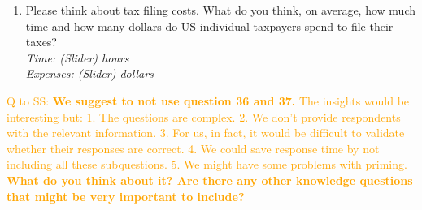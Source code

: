\documentclass[11pt]{article}
\newcommand{\tk}[1]{\textcolor{orange}{#1}}
\begin{document}
\begin{enumerate}[resume]
    \item Please think about tax filing costs. What do you think, on average, how much time and how many dollars do US individual taxpayers spend to file their taxes? \\
    \textit{Time: (Slider) hours} \\
    \textit{Expenses: (Slider) dollars}
\end{enumerate}
\vspace{0.5em}
\tk{Q to SS: \textbf{We suggest to not use question 36 and 37.} The insights would be interesting but: 1. The questions are complex. 2. We don't provide respondents with the relevant information. 3. For us, in fact, it would be difficult to validate whether their responses are correct. 4. We could save response time by not including all these subquestions. 5. We might have some problems with priming. \textbf{What do you think about it? Are there any other knowledge questions that might be very important to include?}}
\end{document}
